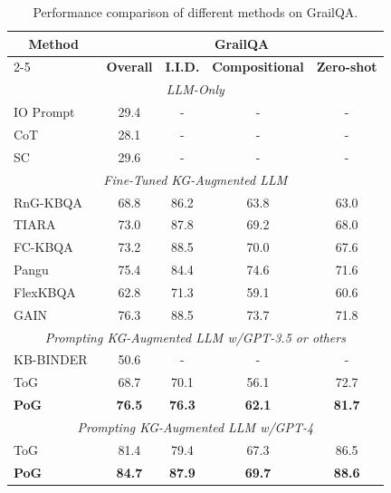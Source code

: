 \documentclass{article}
\begin{document}
\begin{table}[t]
\small
\setlength{\belowcaptionskip}{-0.1mm}
\caption{Performance comparison of different methods on GrailQA.}
\label{Tab:maing}
\centering
\begin{tabular}{lcccc}
\toprule
\multicolumn{1}{c}{\multirow{2}{*}{\textbf{Method}}}               & \multicolumn{4}{c}{\textbf{GrailQA}}                              \\ \cmidrule(l){2-5} 
\multicolumn{1}{c}{}                                               & \multicolumn{1}{l}{\textbf{Overall}} & \textbf{I.I.D.} & \textbf{Compositional} & \textbf{Zero-shot} \\ \midrule
\multicolumn{5}{c}{\textit{LLM-Only}} \\ 
\midrule
IO Prompt~\cite{brown2020language}&29.4&-&-&-\\
CoT~\cite{wei2022chain}&28.1&-&-&-\\
SC~\cite{wang2023self}&29.6&-&-&-\\  
\midrule
\multicolumn{5}{c}{\textit{Fine-Tuned KG-Augmented LLM}}                                                                                               \\ \midrule
RnG-KBQA~\cite{ye2022rng} & 68.8&86.2&63.8&63.0\\
TIARA~\cite{shu2022tiara} & 73.0&87.8&69.2&68.0\\
FC-KBQA~\cite{zhang2023fc}&73.2&88.5&70.0&67.6\\
Pangu~\cite{gu2023don} & 75.4&84.4&74.6&71.6\\
FlexKBQA~\cite{li2024flexkbqa} &62.8&71.3&59.1&60.6\\
GAIN~\cite{shu2024distribution} & 76.3&88.5&73.7&71.8\\
 \midrule
\multicolumn{5}{c}{\textit{Prompting KG-Augmented LLM w/GPT-3.5 or others}}             \\            
\midrule
KB-BINDER~\cite{li2023few}&50.6&-&-&-\\
ToG~\cite{sun2024think}&                            68.7 &  70.1   &   56.1 &   72.7    \\
\textbf{PoG}&\textbf{76.5}&\textbf{76.3}&\textbf{62.1}&\textbf{81.7} \\ \midrule
\multicolumn{5}{c}{\textit{Prompting KG-Augmented LLM w/GPT-4}}                                                                                        \\ \midrule
ToG~\cite{sun2024think}&81.4 & 79.4&67.3&86.5 \\
\textbf{PoG}&\textbf{84.7}&\textbf{87.9}&\textbf{69.7}&\textbf{88.6}\\ \bottomrule
\end{tabular}
\vspace{-2mm}
\end{table}
\end{document}
